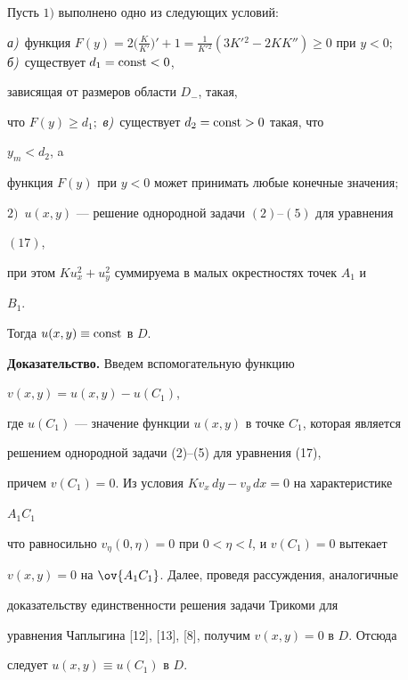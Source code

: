 \begin{thm} 


Пусть $1)$ выполнено одно из следующих условий\/$:$ 


{\em а)}~функция $F(y)=2\big(\frac{K}{K'}\big)'+1=\frac{1}{K'{}^2} 


(3K'{}^2-2K K'')\ge0$ при $y<0;$ {\em б)}~существует $d_1=\const<0$, 


зависящая от размеров области $D_-$, такая, 


что $F(y)\ge d_1;$ {\em в)}~существует $d_2=\operatorname{const}>0$ такая, что 


$y_m<d_2$, a 


функция $F(y)$ при $y<0$ может принимать любые конечные значения\/$;$ 


$2)$~$u(x,y)$ --- решение однородной задачи $(2)$--$(5)$ для уравнения 


$(17)$, 


при этом $K u^2_x+u^2_y$ суммируема в малых окрестностях точек $A_1$ и 


$B_1$. 


 


Тогда $u(x,y)\equiv\operatorname{const}$ в $D$. 


\end{thm} 


 


{\bf Доказательство.} Введем вспомогательную функцию 


$v(x,y)=u(x,y)-u(C_1)$, 


где $u(C_1)$ --- значение функции $u(x,y)$ в точке $C_1$, которая является 


решением однородной задачи (2)--(5) для уравнения (17), 


причем $v(C_1)=0$. Из условия $K v_x\,dy-v_y\,dx=0$ на характеристике 


$A_1C_1$ 


что равносильно $v_\eta(0,\eta)=0$ при $0<\eta<l$, и $v(C_1)=0$ вытекает 


$v(x,y)=0$ на $\ov{A_1C_1}$. Далее, проведя рассуждения, аналогичные 


доказательству единственности решения задачи Трикоми для 


уравнения Чаплыгина [12], [13], [8], получим $v(x,y)=0$ в $D$. Отсюда 


следует $u(x,y)\equiv u(C_1)$ в $D$. 


 


